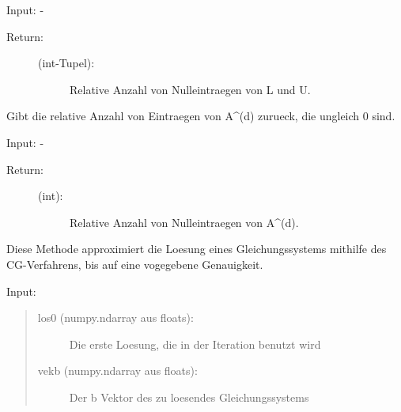 \documentclass[letterpaper,10pt,ngerman]{sphinxmanual}
\begin{document}
\begin{fulllineitems}
\begin{fulllineitems}
Input: -
\begin{description}
\item[{Return:}] \leavevmode\begin{description}
\item[{(int-Tupel):}] \leavevmode
Relative Anzahl von Nulleintraegen von L und U.

\end{description}

\end{description}

\end{fulllineitems}


\begin{fulllineitems}
\label{\detokenize{index:sparse_erw.Sparse.anz_nn_rel}}
Gibt die relative Anzahl von Eintraegen von A\textasciicircum{}(d) zurueck, die ungleich 0 sind.

Input: -
\begin{description}
\item[{Return:}] \leavevmode\begin{description}
\item[{(int):}] \leavevmode
Relative Anzahl von Nulleintraegen von A\textasciicircum{}(d).

\end{description}

\end{description}

\end{fulllineitems}


\begin{fulllineitems}
\label{\detokenize{index:sparse_erw.Sparse.cg_meth}}
Diese Methode approximiert die Loesung eines Gleichungssystems mithilfe des CG-Verfahrens,
bis auf eine vogegebene Genauigkeit.

Input:
\begin{quote}
\begin{description}
\item[{los0 (numpy.ndarray aus floats):}] \leavevmode
Die erste Loesung, die in der Iteration benutzt wird

\item[{vekb (numpy.ndarray aus floats):}] \leavevmode
Der b Vektor des zu loesendes Gleichungssystems


\end{description}
\end{quote}
\end{fulllineitems}
\end{fulllineitems}
\end{document}
